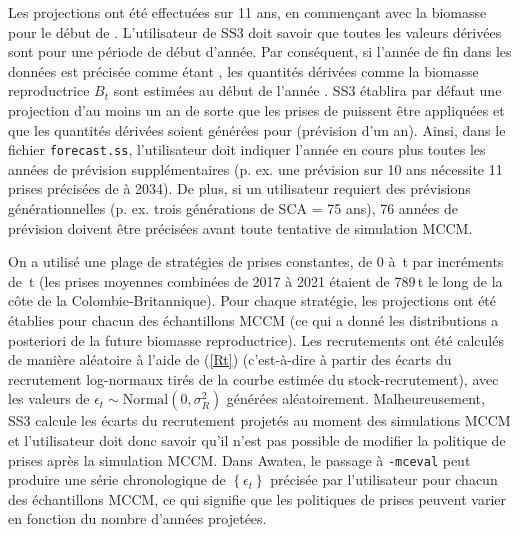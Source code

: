\documentclass[11pt]{book}
\newcommand{\code}[1]{\normalsize\texttt{#1}\normalsize}%
\newcommand{\eref}[1]{(\ref{#1})}
\begin{document}
Les projections ont \'{e}t\'{e} effectu\'{e}es sur 11 ans, en commen\c{c}ant avec la biomasse pour le d\'{e}but de \currYear.
L'utilisateur de SS3 doit savoir que toutes les valeurs d\'{e}riv\'{e}es sont pour une p\'{e}riode de d\'{e}but d'ann\'{e}e. Par cons\'{e}quent, si l'ann\'{e}e de fin dans les donn\'{e}es est pr\'{e}cis\'{e}e comme \'{e}tant \prevYear, les quantit\'{e}s d\'{e}riv\'{e}es comme la biomasse reproductrice $B_t$ sont estim\'{e}es au d\'{e}but de l'ann\'{e}e \prevYear.
SS3 \'{e}tablira par d\'{e}faut une projection d'au moins un an de sorte que les prises de \prevYear{} puissent \^{e}tre appliqu\'{e}es et que les quantit\'{e}s d\'{e}riv\'{e}es soient g\'{e}n\'{e}r\'{e}es pour \currYear{} (pr\'{e}vision d'un an).
Ainsi, dans le fichier \code{forecast.ss}, l'utilisateur doit indiquer l'ann\'{e}e en cours plus toutes les ann\'{e}es de pr\'{e}vision suppl\'{e}mentaires (p. ex. une pr\'{e}vision sur 10 ans n\'{e}cessite 11 prises pr\'{e}cis\'{e}es de \currYear{} \`{a} 2034).
De plus, si un utilisateur requiert des pr\'{e}visions g\'{e}n\'{e}rationnelles (p. ex. trois g\'{e}n\'{e}rations de SCA = 75 ans), 76 ann\'{e}es de pr\'{e}vision doivent \^{e}tre pr\'{e}cis\'{e}es avant toute tentative de simulation MCCM.

On a utilis\'{e} une plage de strat\'{e}gies de prises constantes, de 0 \`{a} \policyMax\,t par incr\'{e}ments de \policyInc\,t (les prises moyennes combin\'{e}es de 2017 \`{a} 2021 \'{e}taient de 789\,t le long de la c\^{o}te de la Colombie-Britannique). Pour chaque strat\'{e}gie, les projections ont \'{e}t\'{e} \'{e}tablies pour chacun des \Nbase{} \'{e}chantillons MCCM (ce qui a donn\'{e} les distributions a posteriori de la future biomasse reproductrice).
Les recrutements ont \'{e}t\'{e} calcul\'{e}s de mani\`{e}re al\'{e}atoire \`{a} l'aide de \eref{Rt} (c'est-\`{a}-dire \`{a} partir des \'{e}carts du recrutement log-normaux tir\'{e}s de la courbe estim\'{e}e du stock-recrutement), avec les valeurs de $\epsilon_t \sim \mbox{Normal}(0, \sigma_R^2)$ g\'{e}n\'{e}r\'{e}es al\'{e}atoirement. 
Malheureusement, SS3 calcule les \'{e}carts du recrutement projet\'{e}s au moment des simulations MCCM et l'utilisateur doit donc savoir qu'il n'est pas possible de modifier la politique de prises apr\`{e}s la simulation MCCM. Dans Awatea, le passage \`{a} \code{-mceval} peut produire une s\'{e}rie chronologique de $\left\{ \epsilon_t \right\}$ pr\'{e}cis\'{e}e par l'utilisateur pour chacun des \'{e}chantillons MCCM, ce qui signifie que les politiques de prises peuvent varier en fonction du nombre d'ann\'{e}es projet\'{e}es.



\renewcommand\bibsection{\section{R\'{E}F\'{E}RENCES CIT\'{E}ES -- \'{E}QUATIONS DES MOD\`{E}LES}}

\end{document}
